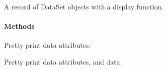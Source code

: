 \documentclass[letterpaper,10pt,english]{sphinxmanual}
\begin{document}

\begin{fulllineitems}
\label{loader:loader.DataSets}
A record of DataSet objects with a display function.
\paragraph{Methods}

\begin{fulllineitems}
\label{loader:loader.DataSets.show}
Pretty print data attributes.

\end{fulllineitems}


\begin{fulllineitems}
\label{loader:loader.DataSets.showmore}
Pretty print data attributes, and data.

\end{fulllineitems}


\end{fulllineitems}

\end{document}
